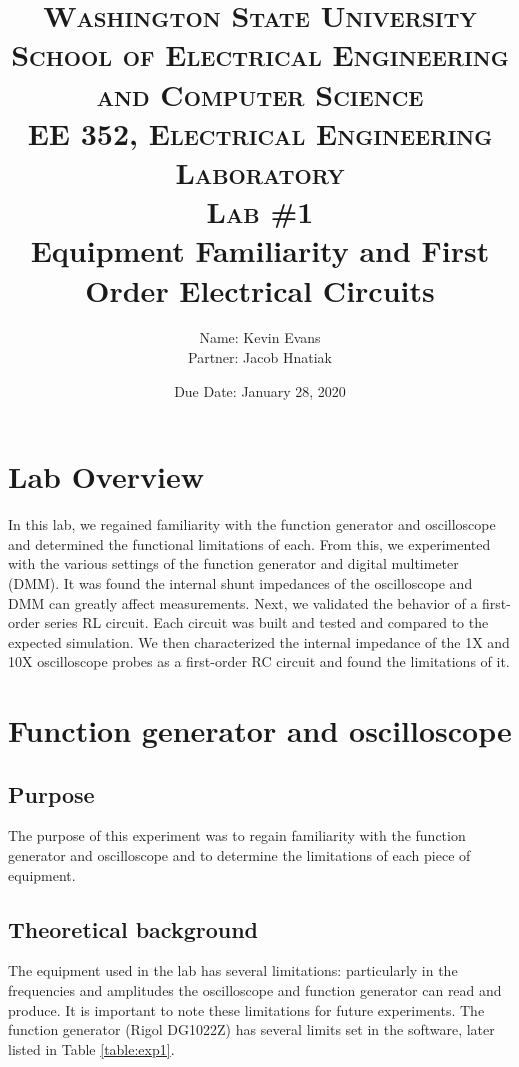 \documentclass{report}
\title{
	\textsc{ \small
		Washington State University \\
		School of Electrical Engineering and Computer Science \\
		EE 352, Electrical Engineering Laboratory
	} \\
	{\textsc{\small Lab \#1}} \\
	Equipment Familiarity and First Order Electrical Circuits
}
\author{
	Name: Kevin Evans \\
	Partner: Jacob Hnatiak
}
\date{Due Date: January 28, 2020}
\begin{document}
\maketitle
\section*{Lab Overview}
In this lab, we regained familiarity with the function generator and oscilloscope and determined the functional limitations of each. From this, we experimented with the various settings of the function generator and digital multimeter (DMM). It was found the internal shunt impedances of the oscilloscope and DMM can greatly affect measurements. Next, we validated the behavior of a first-order series RL circuit. Each circuit was built and tested and compared to the expected simulation. We then characterized the internal impedance of the 1X and 10X oscilloscope probes as a first-order RC circuit and found the limitations of it.


\section{Function generator and oscilloscope}
\subsection{Purpose}
The purpose of this experiment was to regain familiarity with the function generator and oscilloscope and to determine the limitations of each piece of equipment. 

\subsection{Theoretical background}
The equipment used in the lab has several limitations: particularly in the frequencies and amplitudes the oscilloscope and function generator can read and produce. It is important to note these limitations for future experiments. The function generator (Rigol DG1022Z) has several limits set in the software, later listed in Table \ref{table:exp1}.
\end{document}
